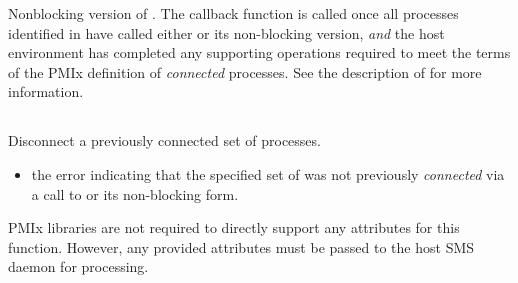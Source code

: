 
\optattrend

\descr

Nonblocking version of . The callback function is called once all processes identified in  have called either  or its non-blocking version, \textit{and} the host environment has completed any supporting operations required to meet the terms of the \ac{PMIx} definition of \textit{connected} processes. See the description of  for more information.


\subsection{}

\summary

Disconnect a previously connected set of processes.

\format


\begin{arglist}
\end{arglist}

\returnstart
\begin{itemize}
    \item the  error indicating that the specified set of  was not previously \textit{connected} via a call to  or its non-blocking form.
\end{itemize}
\returnend

\reqattrstart
\ac{PMIx} libraries are not required to directly support any attributes for this function. However, any provided attributes must be passed to the host \ac{SMS} daemon for processing.

\reqattrend

